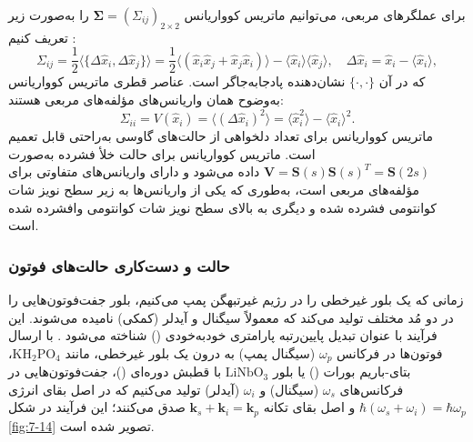 برای عملگرهای مربعی، می‌توانیم ماتریس کوواریانس $\bm{\Sigma} = (\Sigma_{ij})_{2 \times 2}$ را به‌صورت زیر تعریف کنیم \cite{7-80}:
\begin{equation}
	\Sigma_{ij} = \frac{1}{2} \langle \{ \Delta \hat{x}_i, \Delta \hat{x}_j \} \rangle = \frac{1}{2} \langle (\hat{x}_i \hat{x}_j + \hat{x}_j \hat{x}_i) \rangle - \langle \hat{x}_i \rangle \langle \hat{x}_j \rangle, \quad \Delta \hat{x}_i = \hat{x}_i - \langle \hat{x}_i \rangle,
	\label{eq:7-92}
\end{equation}
که در آن $\{\cdot, \cdot\}$ نشان‌دهنده پادجابه‌جاگر است. عناصر قطری ماتریس کوواریانس به‌وضوح همان واریانس‌های مؤلفه‌های مربعی هستند:
\begin{equation}
	\Sigma_{ii} = V(\hat{x}_i) = \langle (\Delta \hat{x}_i)^2 \rangle = \langle \hat{x}_i^2 \rangle - \langle \hat{x}_i \rangle^2.
	\label{eq:7-93}
\end{equation}
ماتریس کوواریانس برای تعداد دلخواهی از حالت‌های گاوسی به‌راحتی قابل تعمیم است. ماتریس کوواریانس برای حالت خلأ فشرده به‌صورت $\bm{V} = \bm{S}(s) \bm{S}(s)^T = \bm{S}(2s)$ داده می‌شود و دارای واریانس‌های متفاوتی برای مؤلفه‌های مربعی است، به‌طوری که یکی از واریانس‌ها به زیر سطح نویز شات کوانتومی فشرده شده و دیگری به بالای سطح نویز شات کوانتومی وافشرده شده است.






\subsubsection{حالت  و دست‌کاری حالت‌های فوتون}
\label{subsec:7-5-3}
زمانی که یک بلور غیرخطی را در رژیم غیرتبهگن پمپ می‌کنیم، بلور جفت‌فوتون‌هایی را در دو مُد مختلف تولید می‌کند که معمولاً سیگنال و آیدلر (کمکی) نامیده می‌شوند. این فرآیند با عنوان تبدیل پایین‌رتبه پارامتری خودبه‌خودی () شناخته می‌شود \cite{7-8, 7-78, 7-79, 7-80}. با ارسال فوتون‌ها در فرکانس $\omega_p$ (سیگنال پمپ) به درون یک بلور غیرخطی، مانند $\text{KH}_2\text{PO}_4$، بتای-باریم بورات () یا بلور $\text{LiNbO}_3$ با قطبش دوره‌ای ()، جفت‌فوتون‌هایی در فرکانس‌های $\omega_s$ (سیگنال) و $\omega_i$ (آیدلر) تولید می‌کنیم که در اصل بقای انرژی $\hbar(\omega_s + \omega_i) = \hbar\omega_p$ و اصل بقای تکانه $\bm{k}_s + \bm{k}_i = \bm{k}_p$ صدق می‌کنند؛ این فرآیند در شکل \ref{fig:7-14} تصویر شده است.

